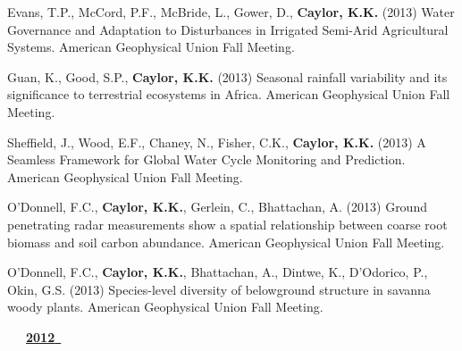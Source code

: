 \begin{etaremune}
\item Evans, T.P., McCord, P.F., McBride, L., Gower, D., \textbf{ Caylor, K.K.} (2013) Water Governance and Adaptation to Disturbances in Irrigated Semi-Arid Agricultural Systems. American Geophysical Union Fall Meeting.
\item Guan, K., Good, S.P., \textbf{ Caylor, K.K.} (2013) Seasonal rainfall variability and its significance to terrestrial ecosystems in Africa. American Geophysical Union Fall Meeting.
\item Sheffield, J., Wood, E.F., Chaney, N., Fisher, C.K., \textbf{ Caylor, K.K.} (2013) A Seamless Framework for Global Water Cycle Monitoring and Prediction. American Geophysical Union Fall Meeting.
\item O'Donnell, F.C., \textbf{ Caylor, K.K.}, Gerlein, C., Bhattachan, A. (2013) Ground penetrating radar measurements show a spatial relationship between coarse root biomass and soil carbon abundance. American Geophysical Union Fall Meeting.
\item O'Donnell, F.C., \textbf{ Caylor, K.K.}, Bhattachan, A., Dintwe, K., D'Odorico, P., Okin, G.S. (2013) Species-level diversity of belowground structure in savanna woody plants. American Geophysical Union Fall Meeting.

\vspace{0.1in}
\mbox{\ \ \ \underline{\textbf{2012 }}}
\vspace{0.1in}


\end{etaremune}

